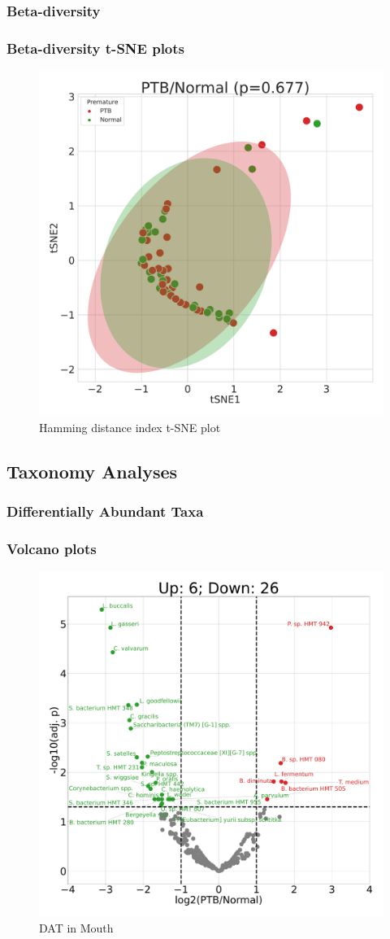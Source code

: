 \documentclass{beamer}
\begin{document}
    \subsubsection{Beta-diversity}
    \begin{frame}[allowframebreaks]
        \frametitle{Beta-diversity t-SNE plots}

        \begin{figure}
            \includegraphics[width=0.5 \linewidth]{figures/BetaDiversity/singleton.DADA2.homd/All+euclidean+Mouth.pdf}
            \caption{Hamming distance index t-SNE plot}
        \end{figure}
    \end{frame}

    \subsection{Taxonomy Analyses}
    \subsubsection{Differentially Abundant Taxa}
    \begin{frame}
        \frametitle{Volcano plots}

        \begin{figure}
            \includegraphics[width=0.5 \linewidth]{figures/Step44/singleton.DADA2.homd.uncorrected.Mouth.pdf}
            \caption{DAT in Mouth}
        \end{figure}
    \end{frame}
\end{document}
